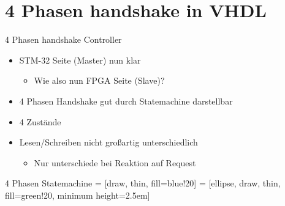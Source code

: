   \section{4 Phasen handshake in VHDL}
  \begin{frame} {4 Phasen handshake Controller}
    \begin{block} {}
      \begin{itemize}
        \item STM-32 Seite (Master) nun klar
        \begin{itemize}
          \item Wie also nun FPGA Seite (Slave)?
        \end{itemize}
        \item 4 Phasen Handshake gut durch Statemachine darstellbar
        \item 4 Zustände
        \item Lesen/Schreiben nicht großartig unterschiedlich
        \begin{itemize}
          \item Nur unterschiede bei Reaktion auf Request
        \end{itemize}
      \end{itemize}
    \end{block}
  \end{frame}


  \begin{frame} {4 Phasen Statemachine}
     = [draw, thin, fill=blue!20]
     = [ellipse, draw, thin, fill=green!20, minimum height=2.5em]
    \begin{center}
      \begin{figure}
      \end{figure}
    \end{center}
  \end{frame}

